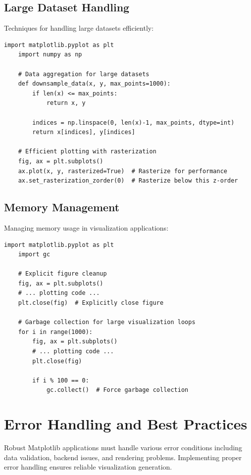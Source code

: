 \subsection{Large Dataset Handling}
\label{subsec:large_datasets}

Techniques for handling large datasets efficiently:

\begin{lstlisting}[language=MyPython, caption={Large Dataset Optimization}, label={lst:large_datasets}]
	import matplotlib.pyplot as plt
	import numpy as np
	
	# Data aggregation for large datasets
	def downsample_data(x, y, max_points=1000):
	    if len(x) <= max_points:
	        return x, y
	    
	    indices = np.linspace(0, len(x)-1, max_points, dtype=int)
	    return x[indices], y[indices]
	
	# Efficient plotting with rasterization
	fig, ax = plt.subplots()
	ax.plot(x, y, rasterized=True)  # Rasterize for performance
	ax.set_rasterization_zorder(0)  # Rasterize below this z-order
\end{lstlisting}

\subsection{Memory Management}
\label{subsec:memory_management}

Managing memory usage in visualization applications:

\begin{lstlisting}[language=MyPython, caption={Memory Management}, label={lst:memory_management}]
	import matplotlib.pyplot as plt
	import gc
	
	# Explicit figure cleanup
	fig, ax = plt.subplots()
	# ... plotting code ...
	plt.close(fig)  # Explicitly close figure
	
	# Garbage collection for large visualization loops
	for i in range(1000):
	    fig, ax = plt.subplots()
	    # ... plotting code ...
	    plt.close(fig)
	    
	    if i % 100 == 0:
	        gc.collect()  # Force garbage collection
\end{lstlisting}

\section{Error Handling and Best Practices}
\label{sec:best_practices}

Robust Matplotlib applications must handle various error conditions including data validation, backend issues, and rendering problems. Implementing proper error handling ensures reliable visualization generation.

